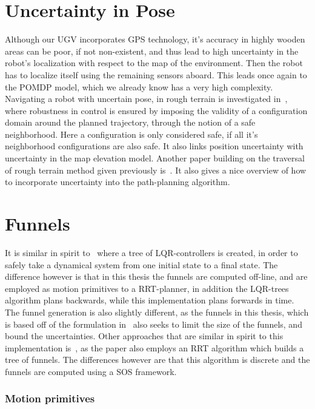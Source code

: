 \section{Uncertainty in Pose}
Although our UGV incorporates GPS technology, it's accuracy in highly wooden
areas can be poor, if not non-existent, and thus lead to high uncertainty in the
robot's localization with respect to the map of the environment. Then the robot
has to localize itself using the remaining sensors aboard. This leads once again
to the POMDP model, which we already know has a very high complexity. Navigating
a robot with uncertain pose, in rough terrain is investigated
in~\cite{haitMotionPlanningRough1996}, where robustness in control is ensured by
imposing the validity of a configuration domain around the planned trajectory,
through the notion of a safe neighborhood. Here a configuration is only
considered safe, if all it's neighborhood configurations are also safe. It also
links position uncertainty with uncertainty in the map elevation model. Another
paper building on the traversal of rough terrain method given previously
is~\cite{iagnemmaRapidPhysicsbasedRoughterrain1999}. It also gives a nice
overview of how to incorporate uncertainty into the path-planning algorithm.

\section{Funnels}

It is similar in spirit to~\cite{tedrakeLQRtreesFeedbackMotion2009} where a tree
of \ac{LQR}-controllers is created, in order to safely take a dynamical system
from one initial state to a final state. The difference however is that in this
thesis the funnels are computed off-line, and are employed as motion primitives
to a \ac{RRT}-planner, in addition the \ac{LQR}-trees algorithm plans backwards,
while this implementation plans forwards in time. The funnel generation is also
slightly different, as the funnels in this thesis, which is based off of the
formulation in~\cite{majumdarFunnelLibrariesRealtime2017} also seeks to limit
the size of the funnels, and bound the uncertainties. Other approaches that are
similar in spirit to this implementation
is~\cite{lenySequentialCompositionRobust2012}, as the paper also employs an
\ac{RRT} algorithm which builds a tree of funnels. The differences however are
that this algorithm is discrete and the funnels are computed using a \ac{SOS}
framework.

\subsubsection{Motion primitives}

